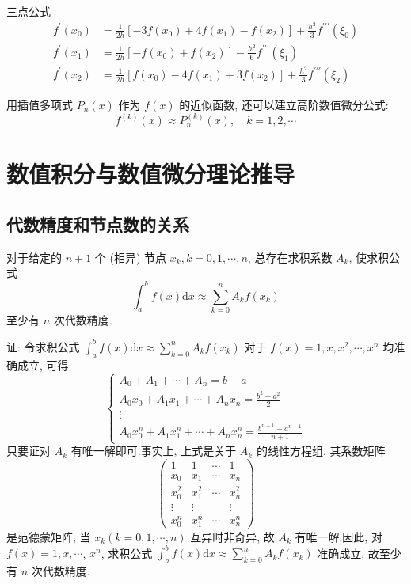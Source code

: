 三点公式
$$
\begin{aligned}
f^{\prime}\left(x_{0}\right)&=\frac{1}{2 h}\left[-3 f\left(x_{0}\right)+4 f\left(x_{1}\right)-f\left(x_{2}\right)\right]+\frac{h^{2}}{3} f^{\prime \prime \prime}\left(\xi_{0}\right) \\
f^{\prime}\left(x_{1}\right)&=\frac{1}{2 h}\left[-f\left(x_{0}\right)+f\left(x_{2}\right)\right]-\frac{h^{2}}{6} f^{\prime \prime \prime}\left(\xi_{1}\right) \\
f^{\prime}\left(x_{2}\right)&=\frac{1}{2 h}\left[f\left(x_{0}\right)-4 f\left(x_{1}\right)+3 f\left(x_{2}\right)\right]+\frac{h^{2}}{3} f^{\prime \prime \prime}\left(\xi_{2}\right)
\end{aligned}
$$

用插值多项式 $ P_{n}(x) $ 作为 $ f(x) $ 的近似函数, 还可以建立高阶数值微分公式:
$$
f^{(k)}(x) \approx P_{n}^{(k)}(x), \quad k=1,2, \cdots
$$


\newpage
\section{数值积分与数值微分理论推导}
\subsection{代数精度和节点数的关系}
\begin{tcolorbox}[enhanced,colback=2,colframe=1,breakable,coltitle=green!25!black,title=定理]
 对于给定的 $ n+1 $ 个 (相异) 节点 $ x_{k}, k=0,1, \cdots, n $, 总存在求积系数 $ A_{k} $, 使求积公式
$$
\int_{a}^{b} f(x) \mathrm{d} x \approx \sum_{k=0}^{n} A_{k} f\left(x_{k}\right)
$$
至少有 $ n $ 次代数精度.
\end{tcolorbox}
证: 令求积公式
$\displaystyle\int_{a}^{b} f(x) \mathrm{d} x \approx \sum_{k=0}^{n} A_{k} f\left(x_{k}\right)$ 对于 $ f(x)=1, x, x^{2}, \cdots, x^{n} $ 均准确成立, 可得
$$
\left\{\begin{array}{l}
A_{0}+A_{1}+\cdots+A_{n}=b-a \\
A_{0} x_{0}+A_{1} x_{1}+\cdots+A_{n} x_{n}=\frac{b^{2}-a^{2}}{2} \\
\vdots \\
A_{0} x_{0}^{n}+A_{1} x_{1}^{n}+\cdots+A_{n} x_{n}^{n}=\frac{b^{n+1}-a^{n+1}}{n+1}
\end{array}\right.
$$
只要证对 $ A_{k} $ 有唯一解即可.事实上, 上式是关于 $ A_{k} $ 的线性方程组, 其系数矩阵
$$
\left(\begin{array}{cccc}
1 & 1 & \cdots & 1 \\
x_{0} & x_{1} & \cdots & x_{n} \\
x_{0}^{2} & x_{1}^{2} & \cdots & x_{n}^{2} \\
\vdots & \vdots & & \vdots \\
x_{0}^{n} & x_{1}^{n} & \cdots & x_{n}^{n}
\end{array}\right)
$$
是范德蒙矩阵, 当 $ x_{k}(k=0,1, \cdots, n) $ 互异时非奇异, 故 $ A_{k} $ 有唯一解.因此, 对 $ f(x)=1, x, \cdots $, $ x^{n} $, 求积公式 $\displaystyle \int_{a}^{b} f(x) \mathrm{d} x \approx \sum_{k=0}^{n} A_{k} f\left(x_{k}\right) $ 准确成立, 故至少有 $ n $ 次代数精度.

